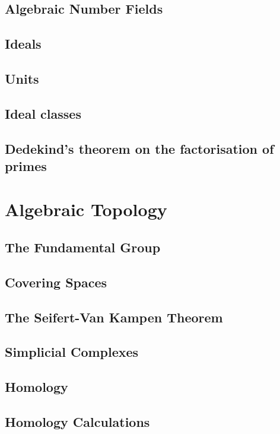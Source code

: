 \documentclass[12pt]{book}
\theoremstyle{definition}
\theoremstyle{remark}
\begin{document}
		\section{Algebraic Number Fields}
		
		\section{Ideals}
		
		\section{Units}
		
		\section{Ideal classes}
		
		\section{Dedekind’s theorem on the factorisation of primes}
	\chapter{Algebraic Topology}
		\section{The Fundamental Group}
		
		\section{Covering Spaces}
		
		\section{The Seifert-Van Kampen Theorem}
		
		\section{Simplicial Complexes}
		
		\section{Homology}
		
		\section{Homology Calculations}
		
\end{document}
